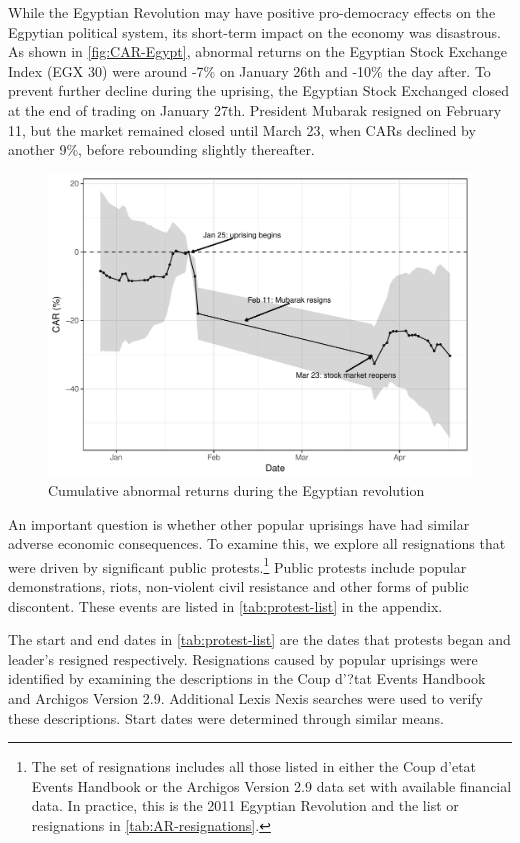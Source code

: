 \documentclass[12pt,final,fleqn]{article}
\theoremstyle{plain}
\begin{document}
While the Egyptian Revolution may have positive pro-democracy effects on the Egpytian political system, its short-term impact on the economy was disastrous. As shown in \autoref{fig:CAR-Egypt}, abnormal returns on the Egyptian Stock Exchange Index (EGX 30) were around -7\% on January 26th and -10\% the day after. To prevent further decline during the uprising, the Egyptian Stock Exchanged closed at the end of trading on January 27th. President Mubarak resigned on February 11, but the market remained closed until March 23, when CARs declined by another 9\%, before rebounding slightly thereafter.

\begin{figure}[!ht]
\includegraphics{../figs/egypt-revolution-2011.pdf}
\caption{Cumulative abnormal returns during the Egyptian revolution}
\label{fig:CAR-Egypt}
\end{figure}

An important question is whether other popular uprisings have had similar adverse economic consequences. To examine this, we explore all resignations that were driven by significant public protests.\footnote{The set of resignations includes all those listed in either the Coup d'etat Events Handbook or the Archigos Version 2.9 data set with available financial data. In practice, this is the 2011 Egyptian Revolution and the list or resignations in \autoref{tab:AR-resignations}.} Public protests include popular demonstrations, riots, non-violent civil resistance and other forms of public discontent. These events are listed in \autoref{tab:protest-list} in the appendix.

The start and end dates in \autoref{tab:protest-list} are the dates that protests began and leader's resigned respectively. Resignations caused by popular uprisings were identified by examining the descriptions in the Coup d'?tat Events Handbook and Archigos Version 2.9. Additional Lexis Nexis searches were used to verify these descriptions. Start dates were determined through similar means.
\end{document}
